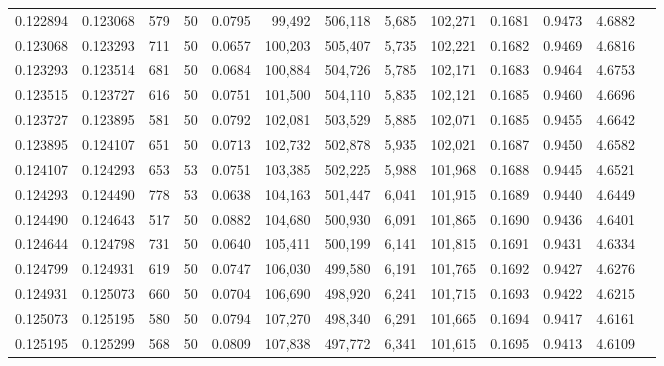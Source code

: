 \begin{tabular}{rrrrrrrrrrrrr}
0.122894 & 0.123068 &   579 &  50 &                                     0.0795 &  99,492 & 506,118 &   5,685 & 102,271 & 0.1681 & 0.9473 & 4.6882 \\
0.123068 & 0.123293 &   711 &  50 &                                     0.0657 & 100,203 & 505,407 &   5,735 & 102,221 & 0.1682 & 0.9469 & 4.6816 \\
0.123293 & 0.123514 &   681 &  50 &                                     0.0684 & 100,884 & 504,726 &   5,785 & 102,171 & 0.1683 & 0.9464 & 4.6753 \\
0.123515 & 0.123727 &   616 &  50 &                                     0.0751 & 101,500 & 504,110 &   5,835 & 102,121 & 0.1685 & 0.9460 & 4.6696 \\
0.123727 & 0.123895 &   581 &  50 &                                     0.0792 & 102,081 & 503,529 &   5,885 & 102,071 & 0.1685 & 0.9455 & 4.6642 \\
0.123895 & 0.124107 &   651 &  50 &                                     0.0713 & 102,732 & 502,878 &   5,935 & 102,021 & 0.1687 & 0.9450 & 4.6582 \\
0.124107 & 0.124293 &   653 &  53 &                                     0.0751 & 103,385 & 502,225 &   5,988 & 101,968 & 0.1688 & 0.9445 & 4.6521 \\
0.124293 & 0.124490 &   778 &  53 &                                     0.0638 & 104,163 & 501,447 &   6,041 & 101,915 & 0.1689 & 0.9440 & 4.6449 \\
0.124490 & 0.124643 &   517 &  50 &                                     0.0882 & 104,680 & 500,930 &   6,091 & 101,865 & 0.1690 & 0.9436 & 4.6401 \\
0.124644 & 0.124798 &   731 &  50 &                                     0.0640 & 105,411 & 500,199 &   6,141 & 101,815 & 0.1691 & 0.9431 & 4.6334 \\
0.124799 & 0.124931 &   619 &  50 &                                     0.0747 & 106,030 & 499,580 &   6,191 & 101,765 & 0.1692 & 0.9427 & 4.6276 \\
0.124931 & 0.125073 &   660 &  50 &                                     0.0704 & 106,690 & 498,920 &   6,241 & 101,715 & 0.1693 & 0.9422 & 4.6215 \\
0.125073 & 0.125195 &   580 &  50 &                                     0.0794 & 107,270 & 498,340 &   6,291 & 101,665 & 0.1694 & 0.9417 & 4.6161 \\
0.125195 & 0.125299 &   568 &  50 &                                     0.0809 & 107,838 & 497,772 &   6,341 & 101,615 & 0.1695 & 0.9413 & 4.6109 \\

\end{tabular}
